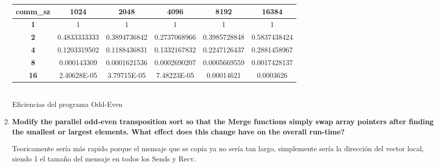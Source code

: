 \documentclass[a4paper,12pt]{article}
\begin{document}
\begin{enumerate}
\begin{center}
\begin{tabular}{|c|c|c|c|c|c|}\hline
\textbf{comm\_sz} & \textbf{1024} & \textbf{2048} & \textbf{4096} & \textbf{8192} & \textbf{16384}\\\hline
\textbf{1} & 1 & 1 & 1 & 1 & 1\\\hline
\textbf{2} & 0.4833333333 & 0.3894736842 & 0.2737068966 & 0.3985728848 & 0.5837438424\\\hline
\textbf{4} & 0.1203319502 & 0.1188436831 & 0.1332167832 & 0.2247126437 & 0.2881458967\\\hline
\textbf{8} & 0.000143309 & 0.0001621536 & 0.0002690207 & 0.0005669559 & 0.0017428137\\\hline
\textbf{16} & 2.40628E-05 & 3.79715E-05 & 7.48223E-05 & 0.00014621 & 0.0003626\\\hline
\end{tabular}
\\
Eficiencias del programa Odd-Even
\end{center}


\item \textbf{Modify the parallel odd-even transposition sort so that the Merge functions simply swap
array pointers after finding the smallest or largest elements. What effect does this change have on
the overall run-time?}

Teoricamente sería más rapido porque el mensaje que se copia ya no sería tan largo, simplemente sería la
dirección del vector local, siendo 1 el tamaño del mensaje en todos los Sends y Recv.
\end{enumerate}
\end{document}
